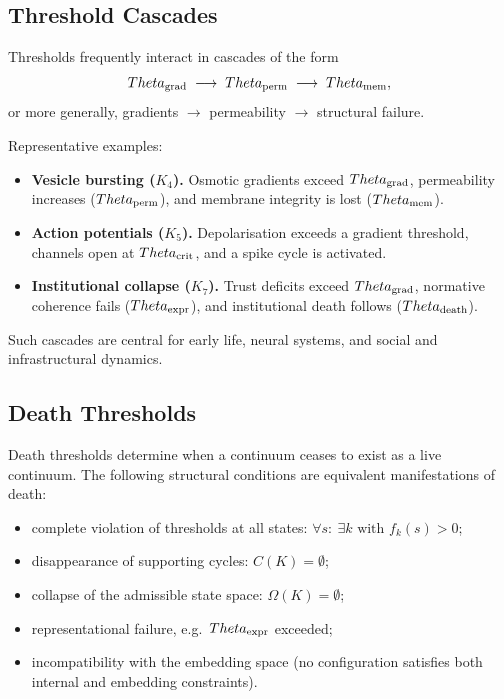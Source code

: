 \subsection{Threshold Cascades}

Thresholds frequently interact in cascades of the form
\[
  \Theta_{\rm grad}
  \;\longrightarrow\;
  \Theta_{\rm perm}
  \;\longrightarrow\;
  \Theta_{\rm mem},
\]
or more generally, gradients \(\to\) permeability \(\to\) structural failure.

Representative examples:

\begin{itemize}
    \item \textbf{Vesicle bursting (\(K_4\)).}
          Osmotic gradients exceed \(\Theta_{\rm grad}\), permeability increases
          (\(\Theta_{\rm perm}\)), and membrane integrity is lost
          (\(\Theta_{\rm mem}\)).
    \item \textbf{Action potentials (\(K_5\)).}
          Depolarisation exceeds a gradient threshold, channels open at
          \(\Theta_{\rm crit}\), and a spike cycle is activated.
    \item \textbf{Institutional collapse (\(K_7\)).}
          Trust deficits exceed \(\Theta_{\rm grad}\), normative coherence
          fails (\(\Theta_{\rm expr}\)), and institutional death follows
          (\(\Theta_{\rm death}\)).
\end{itemize}

Such cascades are central for early life, neural systems, and social and
infrastructural dynamics.

\subsection{Death Thresholds}

Death thresholds determine when a continuum ceases to exist as a live
continuum. The following structural conditions are equivalent manifestations of
death:
\begin{itemize}
    \item complete violation of thresholds at all states:
          \(\forall s:\ \exists k \text{ with } f_k(s) > 0\);
    \item disappearance of supporting cycles: \(C(K)=\emptyset\);
    \item collapse of the admissible state space: \(\Omega(K)=\emptyset\);
    \item representational failure, e.g.\ \(\Theta_{\rm expr}\) exceeded;
    \item incompatibility with the embedding space (no configuration satisfies
          both internal and embedding constraints).
\end{itemize}

